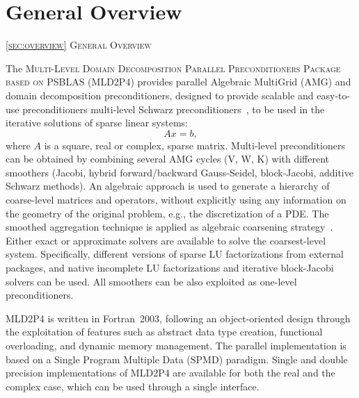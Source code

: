 \section{General Overview\label{sec:overview}}
         {\textsc{\ref{sec:overview} General Overview}}
            
The \textsc{Multi-Level Domain Decomposition Parallel Preconditioners Package based on
PSBLAS (MLD2P4}) provides parallel Algebraic MultiGrid (AMG) and domain decomposition 
preconditioners, designed to provide scalable and easy-to-use preconditioners 
multi-level Schwarz preconditioners~\cite{Stuben_01,dd2_96},
to be used in the iterative solutions of sparse linear systems:
\begin{equation} 
Ax=b, 
\label{system1}
\end{equation} 
where $A$ is a square, real or complex, sparse matrix. 
%
%
Multi-level preconditioners can be obtained by combining several AMG cycles (V, W, K) with 
different smoothers (Jacobi, hybrid forward/backward Gauss-Seidel, block-Jacobi, additive Schwarz methods).
An algebraic approach is used to
generate a hierarchy of coarse-level matrices and operators, without
explicitly using any information on the geometry of the original problem, e.g.,
the discretization of a PDE. The smoothed aggregation technique is applied
as algebraic coarsening strategy~\cite{BREZINA_VANEK,VANEK_MANDEL_BREZINA}.
Either exact or approximate solvers are available to solve the coarsest-level system. Specifically,
different versions of sparse LU factorizations from external packages, and native incomplete
LU factorizations and iterative block-Jacobi solvers can be used.
All smoothers can be also exploited as one-level preconditioners.

MLD2P4 is written in Fortran~2003, following an
object-oriented design through the exploitation of features
such as abstract data type creation, functional overloading, and
dynamic memory management. 
The parallel implementation is based on a Single Program Multiple Data
(SPMD) paradigm.  Single and
double precision implementations of MLD2P4 are available for both the
real and the complex case, which can be used through a single
interface. 

